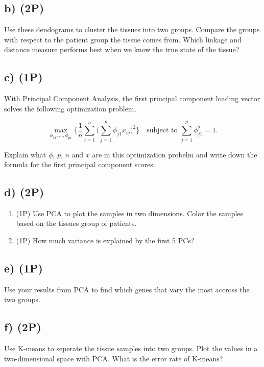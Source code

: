 \documentclass[]{article}
\providecommand{\tightlist}{%
  \setlength{\itemsep}{0pt}\setlength{\parskip}{0pt}}
\begin{document}
\hypertarget{b-2p-2}{%
\subsection{b) (2P)}\label{b-2p-2}}

Use these dendograms to cluster the tissues into two groups. Compare the
groups with respect to the patient group the tissue comes from. Which
linkage and distance measure performs best when we know the true state
of the tissue?

\hypertarget{c-1p}{%
\subsection{c) (1P)}\label{c-1p}}

With Principal Component Analysis, the first principal component loading
vector solves the following optimization problem,

\begin{equation*}
\max_{\phi_{11},...,\phi_{p1}} \Big\{ \frac{1}{n}\sum_{i=1}^n \Big( \sum_{j=1}^p \phi_{j1}x_{ij} \Big)^2  \Big\} \quad \text{subject to } \sum_{j=1}^p\phi_{j1}^2 = 1.
\end{equation*}

Explain what \(\phi\), \(p\), \(n\) and \(x\) are in this optimization
probelm and write down the formula for the first principal component
scores.

\hypertarget{d-2p}{%
\subsection{d) (2P)}\label{d-2p}}

\begin{enumerate}
\def\labelenumi{(\roman{enumi})}
\tightlist
\item
  (1P) Use PCA to plot the samples in two dimensions. Color the samples
  based on the tissues group of patients.
\item
  (1P) How much variance is explained by the first 5 PCs?
\end{enumerate}

\hypertarget{e-1p}{%
\subsection{e) (1P)}\label{e-1p}}

Use your results from PCA to find which genes that vary the most accross
the two groups.

\hypertarget{f-2p}{%
\subsection{f) (2P)}\label{f-2p}}

Use K-means to seperate the tissue samples into two groups. Plot the
values in a two-dimensional space with PCA. What is the error rate of
K-means?
\end{document}
